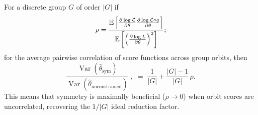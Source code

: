 \begin{theorem}
\noproofref
\noproofref
For a discrete group \(G\) of order \(|G|\) if  
\[\rho=\frac{\operatorname{\mathbb{E}}\qty[\pdv{\log \mathcal L}{\theta}\pdv{\log \mathcal L\circ g}{\theta}]}{\operatorname{\mathbb{E}}\qty[\qty(\pdv{\log L}{\theta})^2]};
\] for the average pairwise correlation of score functions across group orbits,  
then
\[
  \frac{\operatorname{Var}(\hat\theta_{\text{sym}})}
       {\operatorname{Var}(\hat\theta_{\text{unconstrained}})}\;,
  \;=\;
  \frac{1}{|G|}+\frac{|G|-1}{|G|}\,\rho.
\]
This means that symmetry is maximally beneficial (\(\rho \to 0\)) when orbit scores are uncorrelated, recovering the \(1/|G|\) ideal reduction factor.
\end{theorem}
